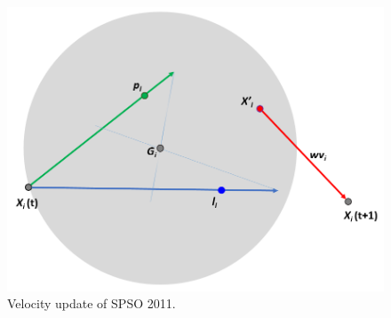 

\begin{figure}[!t] \centering
\includegraphics[width=4.5in]{SPSO_2011}
\caption{Velocity update of SPSO 2011.}\label{fig:SPSO_2011}
\end{figure} 


